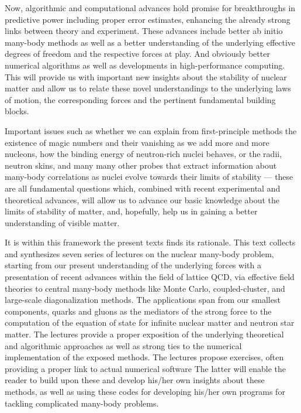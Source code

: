 Now, algorithmic and computational advances hold promise for
breakthroughs in predictive power including proper error estimates,
enhancing the already strong links between theory and experiment.
These advances include better ab initio many-body methods as well as a
better understanding of the underlying effective degrees of freedom
and the respective forces at play.  And obviously better numerical
algorithms as well as developments in high-performance computing.
This will provide us with important new insights about the stability
of nuclear matter and allow us to relate these novel understandings to
the underlying laws of motion, the corresponding forces and the
pertinent fundamental building blocks.

Important issues such as whether we can explain from first-principle
methods the existence of magic numbers and their vanishing as we add
more and more nucleons, how the binding energy of neutron-rich nuclei
behaves, or the radii, neutron skins, and many many other probes that
extract information about many-body correlations as nuclei evolve
towards their limits of stability --- these are all fundamental
questions which, combined with recent experimental and theoretical
advances, will allow us to advance our basic knowledge about the
limits of stability of matter, and, hopefully, help us in gaining a
better understanding of visible matter.

It is within this framework the present texts finds its rationale.
This text collects and synthesizes seven series of lectures on the
nuclear many-body problem, starting from our present understanding of
the underlying forces with a presentation of recent advances within
the field of lattice QCD, via effective field theories to central
many-body methods like Monte Carlo, coupled-cluster, and large-scale
diagonalization methods.  The applications span from our smallest
components, quarks and gluons as the mediators of the strong force to
the computation of the equation of state for infinite nuclear matter
and neutron star matter.  The lectures provide a proper exposition of
the underlying theoretical and algorithmic approaches as well as
strong ties to the numerical implementation of the exposed methods.
The lectures propose exercises, often providing a proper link to
actual numerical software The latter will enable the reader to build
upon these and develop his/her own insights about these methods, as
well as using these codes for developing his/her own programs for
tackling complicated many-body problems.



